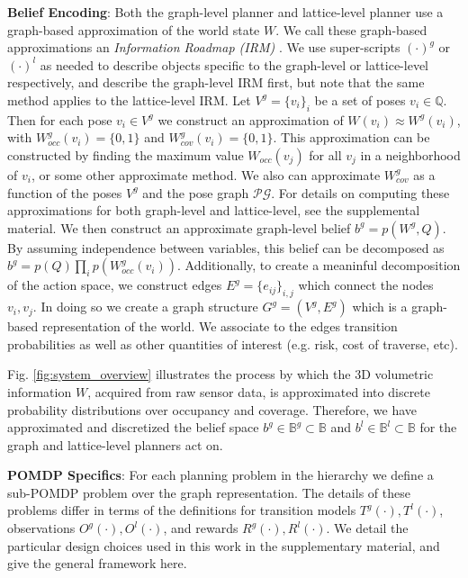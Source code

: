 \documentclass{article}
\newcommand{\ph}[1]{{\textbf{#1}:}} %
\begin{document}
\ph{Belief Encoding} Both the graph-level planner and lattice-level planner use a graph-based approximation of the world state $W$.  We call these graph-based approximations an \textit{Information Roadmap (IRM)} \cite{agha2014firm}.  We use super-scripts $(\cdot)^g$ or $(\cdot)^l$ as needed to describe objects specific to the graph-level or lattice-level respectively, and describe the graph-level IRM first, but note that the same method applies to the lattice-level IRM.  Let $V^g=\{v_i\}_i$ be a set of poses $v_i\in \mathbb{Q}$.  Then for each pose $v_i\in V^g$ we construct an approximation of $W(v_i) \approx W^g(v_i)$, with $W_{occ}^g(v_i) = \{0,1\}$ and $W_{cov}^g(v_i) = \{0,1\}$.  This approximation can be constructed by finding the maximum value $W_{occ}(v_j)$ for all $v_j$ in a neighborhood of $v_i$, or some other approximate method.  We also can approximate $W_{cov}^g$ as a function of the poses $V^g$ and the pose graph $\mathcal{PG}$.  For details on computing these approximations for both graph-level and lattice-level, see the supplemental material.  We then construct an approximate graph-level belief $b^g=p(W^g, Q)$.  By assuming independence between variables, this belief can be decomposed as $b^g=p(Q)\prod_i p(W_{occ}^g(v_i))$.  Additionally, to create a meaninful decomposition of the action space, we construct edges $E^g=\{e_{ij}\}_{i,j}$ which connect the nodes $v_i, v_j$.  In doing so we create a graph structure $G^g=(V^g, E^g)$ which is a graph-based representation of the world.  We associate to the edges transition probabilities as well as other quantities of interest (e.g. risk, cost of traverse, etc).

Fig. \ref{fig:system_overview} illustrates the process by which the 3D volumetric information $W$, acquired from raw sensor data, is approximated into discrete probability distributions over occupancy and coverage. 
Therefore, we have approximated and discretized the belief space $b^g\in\mathbb{B}^g\subset\mathbb{B}$ and $b^l\in\mathbb{B}^l\subset\mathbb{B}$ for the graph and lattice-level planners act on.

\ph{POMDP Specifics} For each planning problem in the hierarchy we define a sub-POMDP problem over the graph representation.  The details of these problems differ in terms of the definitions for transition models $T^g(\cdot),T^l(\cdot)$, observations $O^g(\cdot),O^l(\cdot)$, and rewards $R^g(\cdot),R^l(\cdot)$.  We detail the particular design choices used in this work in the supplementary material, and give the general framework here.
\end{document}
